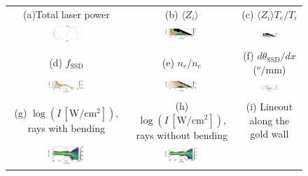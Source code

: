 \documentclass[%
 reprint,
 amsmath,amssymb,
 aps,
]{revtex4-1}
\begin{document}
\begin{figure}
\begin{tabular}{ccc}
(a)Total laser power & (b) $\langle Z_i\rangle $& (c) $\langle Z_i\rangle T_e/T_i$
\\
\includegraphics[width=0.25\textwidth]{Plasertotale.pdf}&
\includegraphics[width=0.33\textwidth]{Z5ps.png}
&
\includegraphics[width=0.33\textwidth]{ZTesTi5ps.png}\\
(d)  $f_\mathrm{SSD}$   &
(e) $n_e/n_c$
&(f) $d\theta_\mathrm{SSD}/dx$ ($^o/$mm) \\
\includegraphics[width=0.33\textwidth]{f5ps.png} 
&\includegraphics[width=0.33\textwidth]{ne5ps.png} 
&\includegraphics[width=0.33\textwidth]{dtheta5ps.png}\\
(g) $\log(I\, [\mathrm{W/cm^2}])$, rays with bending &(h)  $\log(I\, [\mathrm{W/cm^2}])$, rays without bending&(i) Lineout along the gold wall\\
\includegraphics[width=0.33\textwidth]{raybb_FCI2.png} 
&\includegraphics[width=0.33\textwidth]{raybb_FCI2_nobb.png} 

\end{tabular}
\end{figure}
\end{document}
